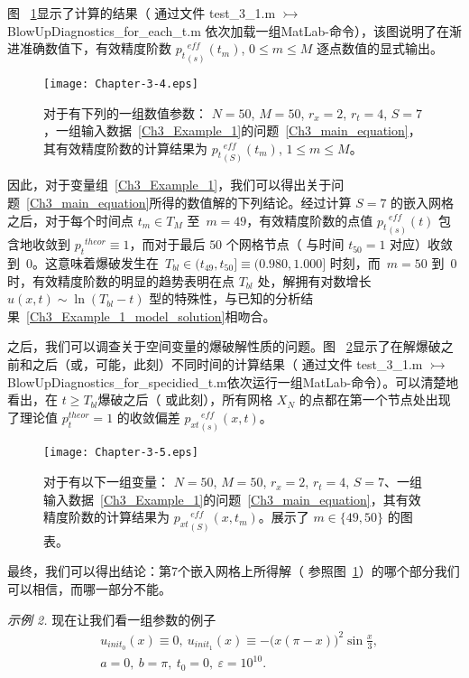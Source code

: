 \documentclass[twoside]{book}
\begin{document}
\begin{CJK*}{GBK}{song}
图 ~\ref{Fig_3_4}显示了计算的结果（ 通过文件 test\_3\_1.m $\rightarrowtail$ BlowUpDiagnostics\_for\_each\_t.m 依次加载一组MatLab-命令），该图说明了在渐进准确数值下，有效精度阶数 ${p_t}^{\, eff}_{(s)}(t_m)$, $0 \leqslant m \leqslant M$ 逐点数值的显式输出。
\begin{figure}[t]
    \centering
    \texttt{[image: Chapter-3-4.eps]}\\
    \caption{对于有下列的一组数值参数： $N = 50$, $M = 50$, $r_x = 2$, $r_t = 4$, $S = 7$，一组输入数据~\eqref{Ch3_Example_1}的问题~\eqref{Ch3_main_equation}，其有效精度阶数的计算结果为 ${p_t}^{\, eff}_{(S)}(t_m)$, $1 \leqslant m \leqslant M$。}
    \label{Fig_3_4}
\end{figure}

因此，对于变量组~\eqref{Ch3_Example_1}，我们可以得出关于问题~\eqref{Ch3_main_equation}所得的数值解的下列结论。经过计算 $S = 7$ 的嵌入网格之后，对于每个时间点 $t_m \in T_M$ 至~$m = 49$，有效精度阶数的点值 ${p_t}^{\, eff}_{(s)}(t)$ 包含地收敛到 ${p_t}^{theor} \equiv 1$，而对于最后 $50$ 个网格节点（ 与时间 $t_{50} = 1$ 对应）收敛到~$0$。这意味着爆破发生在~$T_{bl} \in (t_{49},t_{50}] \equiv (0.980,1.000]$ 时刻，而~$m = 50$ 到~$0$ 时，有效精度阶数的明显的趋势表明在点 $T_{bl}$ 处，解拥有对数增长 $u(x,t) \sim \ln(T_{bl} - t)$ 型的特殊性，与已知的分析结果~\eqref{Ch3_Example_1_model_solution}相吻合。

之后，我们可以调查关于空间变量的爆破解性质的问题。图 ~\ref{Fig_3_5}显示了在解爆破之前和之后（或，可能，此刻）不同时间的计算结果（ 通过文件 test\_3\_1.m $\rightarrowtail$ BlowUpDiagnostics\_for\_specidied\_t.m依次运行一组MatLab-命令）。可以清楚地看出，在 $t \geqslant T_{bl}$爆破之后（ 或此刻），所有网格 $X_N$ 的点都在第一个节点处出现了理论值 $p_t^{theor} = 1$ 的收敛偏差 ${p_{xt}}_{(s)}^{\, eff}(x,t)$。
\begin{figure}[t]
    \centering
    \texttt{[image: Chapter-3-5.eps]}\\
    \caption{对于有以下一组变量： $N = 50$, $M = 50$, $r_x = 2$, $r_t = 4$, $S = 7$、一组输入数据~\eqref{Ch3_Example_1}的问题~\eqref{Ch3_main_equation}，其有效精度阶数的计算结果为 ${p_{xt}}^{\, eff}_{(S)}(x,t_m)$。展示了 $m \in \{49,50\}$ 的图表。}
    \label{Fig_3_5}
\end{figure}

最终，我们可以得出结论：第7个嵌入网格上所得解（ 参照图~\ref{Fig_3_4}）的哪个部分我们可以相信，而哪一部分不能。

\emph{示例 2.} 现在让我们看一组参数的例子
\begin{equation}
    \label{Ch3_Example_2}
    \begin{aligned}
        &u_{init_0}(x)  \equiv 0, \: u_{init_1}(x)  \equiv -\big(x(\pi-x)\big)^2\sin\frac{x}{3}, \\
        &a = 0, \: b = \pi, \: t_0 = 0, \: \varepsilon = 10^{10}.
    \end{aligned}
\end{equation}


\end{CJK*}
\end{document}
